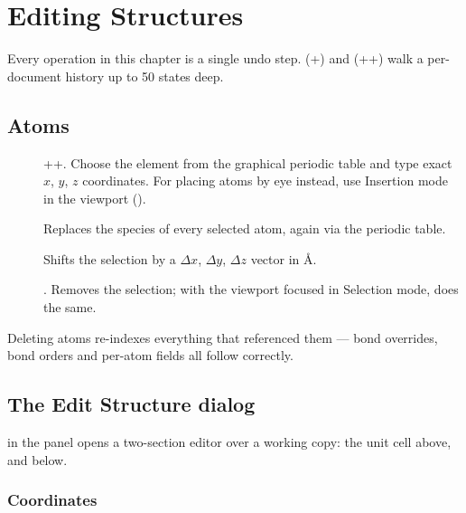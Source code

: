 \chapter{Editing Structures}
\label{ch:editing}

Every operation in this chapter is a single undo step.
\menusep{} (+) and
\menusep{} (++) walk a
per-document history up to 50 states deep.

\section{Atoms}

\begin{description}
  \item[\menusep{}] ++.
    Choose the element from the graphical periodic table and type exact
    $x$, $y$, $z$ coordinates. For placing atoms by eye instead, use
    Insertion mode in the viewport ().
  \item[\menusep{}\menusep{}]
    Replaces the species of every selected atom, again via the periodic
    table.
  \item[\menusep{}\menusep{}]
    Shifts the selection by a $\Delta x$, $\Delta y$, $\Delta z$ vector in
    \AA.
  \item[\menusep{}] .
    Removes the selection; with the viewport focused in Selection mode,
     does the same.
\end{description}

Deleting atoms re-indexes everything that referenced them --- bond
overrides, bond orders and per-atom fields all follow correctly.

\section{The Edit Structure dialog}
\label{sec:editstructure}

 in the  panel opens a two-section
editor over a working copy: the unit cell above, and  below.

\subsection{Coordinates}
\label{sec:fractional-toggle}

